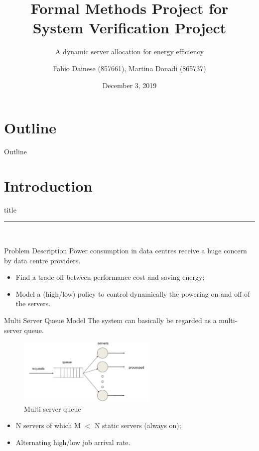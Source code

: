 \documentclass[8pt]{beamer}
\title{Formal Methods Project for System Verification Project}
\subtitle{A dynamic server allocation for energy efficiency}
\author{Fabio Dainese (857661), Martina Donadi (865737)}
\institute{Ca' Foscari, Univeristy of Venice}
\date{December 3, 2019}
\begin{document}
{
    \frame{\titlepage}
}

\section*{Outline}
    \begin{frame}{Outline}
    \tableofcontents
\end{frame}

\section{Introduction}
    \begin{frame}[plain]
        \vfill
        \centering
        \begin{beamercolorbox}[sep=8pt,center,shadow=true,rounded=true]{title}
            \insertsectionhead\par
            \color{univered}\noindent\rule{10cm}{1pt} \\
            \LARGE{\faFileTextO}
        \end{beamercolorbox}
        \vfill
    \end{frame}

    \begin{frame}{Problem Description}
        Power consumption in data centres receive a huge concern by data centre providers. 
        \vspace{1cm}
        \begin{itemize}
            \item Find a trade-off between performance cost and saving energy;
            \item Model a (high/low) policy to control dynamically the powering on and off of the servers.
        \end{itemize}
    \end{frame}

    \begin{frame}{Multi Server Queue Model}
        The system can basically be regarded as a multi-server queue.

        \begin{figure}[H]
            \centering
            \includegraphics[width=0.6\textwidth]{Images/multi-server-queue.png}
            \caption{Multi server queue}
            \label{fig:multi-server-queue}
        \end{figure}

        \begin{itemize}
            \item N servers of which M \(<\) N static servers (always on);
            \item Alternating high/low job arrival rate.
        \end{itemize}
    \end{frame}
\end{document}
